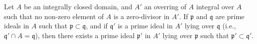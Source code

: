 Let $A$ be an integrally closed domain, and $A'$ an overring of $A$ integral over $A$ such that no non-zero element of $A$ is a zero-divisor in $A'$. If $\mathfrak{p}$ and $\mathfrak{q}$ are prime ideals in $A$ such that $\mathfrak{p} \subset \mathfrak{q}$, and if $\mathfrak{q}'$ is a prime ideal in $A'$ lying over $\mathfrak{q}$ (i.e., $\mathfrak{q}' \cap A = \mathfrak{q}$), then there exists a prime ideal $\mathfrak{p}'$ in $A'$ lying over $\mathfrak{p}$ such that $\mathfrak{p}' \subset \mathfrak{q}'$.
